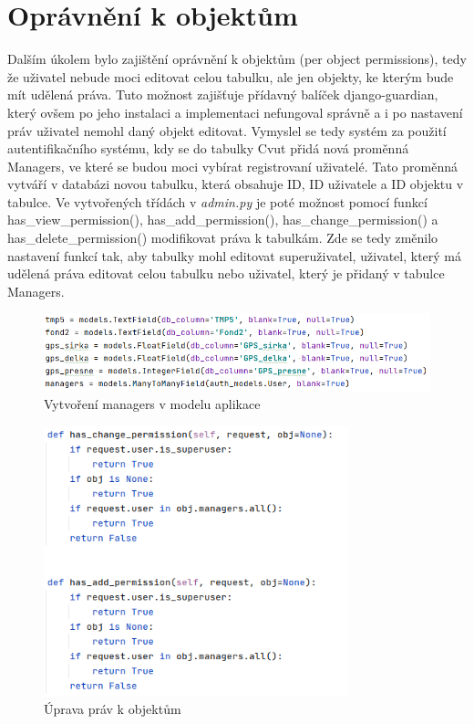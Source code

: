 \section{Oprávnění k objektům}
\label{pop}
Dalším úkolem bylo zajištění oprávnění k objektům (per object permissions), tedy že uživatel nebude moci editovat celou tabulku, ale jen objekty, ke kterým bude mít udělená práva. Tuto možnost zajišťuje přídavný balíček django-guardian, který ovšem po jeho instalaci a implementaci nefungoval správně a i po nastavení práv uživatel nemohl daný objekt editovat. Vymyslel se tedy systém za použití autentifikačního systému, kdy se do tabulky Cvut přidá nová proměnná Managers, ve které se budou moci vybírat registrovaní uživatelé. Tato proměnná vytváří v databázi novou tabulku, která obsahuje ID, ID uživatele a ID objektu v tabulce. Ve vytvořených třídách v \emph{admin.py} je poté možnost pomocí funkcí has\_view\_permission(), has\_add\_permission(), has\_change\_permission() a has\_delete\_permission() modifikovat práva k tabulkám. Zde se tedy změnilo nastavení funkcí tak, aby tabulky mohl editovat superuživatel, uživatel, který má udělená práva editovat celou tabulku nebo uživatel, který je přidaný v tabulce Managers. 

\begin{figure}[H] \centering
    \includegraphics[width=330pt]{./pictures/11-managers-model.PNG}
    \caption[Vytvoření managers v modelu aplikace]{Vytvoření managers v modelu aplikace}
	\label{fig:Vytvoření managers v modelu aplikace}              
\end{figure}

\begin{figure}[H] \centering
    \includegraphics[width=250pt]{./pictures/14-object-permissions.PNG}
    \caption[Úprava práv k objektům]{Úprava práv k objektům}
	\label{fig:Úprava práv k objektům}              
\end{figure}


